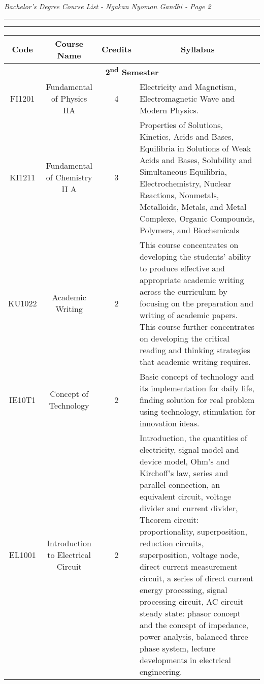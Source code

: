 \documentclass{article}
\begin{document}
    \begin{center}
        \begin{flushleft}
            \textit{\textit{Bachelor's Degree Course List - Ngakan Nyoman Gandhi - Page 2}}
        \end{flushleft}
		
		\normalsize

        \hrule
        \vspace{1pt}
        \hrule height 1pt

        \bigskip

        \begin{tabular}{ | c | c | c | p{6.8cm} |} %
            \hline
            \textbf{Code} & \textbf{Course Name} & \textbf{Credits} & \multicolumn{1}{c|}{\textbf{Syllabus}}\\\hline

            \hline\multicolumn{4}{|c|}{\cellcolor[gray]{0.80}\textbf{2\textsuperscript{nd} Semester}}	\\ \cline{1-4}  
            
			FI1201 & Fundamental of Physics IIA & 4 & Electricity and Magnetism, Electromagnetic Wave and Modern Physics.   \\ \hline     
			
            KI1211 & Fundamental of Chemistry II A & 3 & Properties of Solutions, Kinetics, Acids and Bases, Equilibria   in Solutions of Weak Acids and Bases, Solubility and Simultaneous Equilibria, Electrochemistry, Nuclear Reactions, Nonmetals, Metalloids, Metals, and Metal Complexe, Organic Compounds, Polymers, and Biochemicals \\ \hline
                
            KU1022 & Academic Writing & 2 & This course concentrates on developing the students' ability to produce effective and appropriate academic writing across the curriculum by focusing on the preparation and writing of academic papers. This course further concentrates on developing the critical reading and thinking strategies that academic writing requires. \\ \hline   
            
            IE10T1 & Concept of Technology & 2 & Basic concept of technology and its implementation for daily life, finding solution for real problem using technology, stimulation for innovation ideas. \\ \hline
            
            EL1001 & Introduction to Electrical Circuit & 2 & Introduction, the quantities of electricity, signal model and device model, Ohm's and Kirchoff's law, series and parallel connection, an equivalent circuit, voltage divider and current divider, Theorem circuit: proportionality, superposition, reduction circuits, superposition, voltage node, direct current measurement circuit, a series of direct current energy processing, signal processing circuit, AC circuit steady state: phasor concept and the concept of impedance, power analysis, balanced three phase system, lecture developments in electrical engineering. \\ \hline  
            

\end{tabular}
\end{center}
\end{document}
